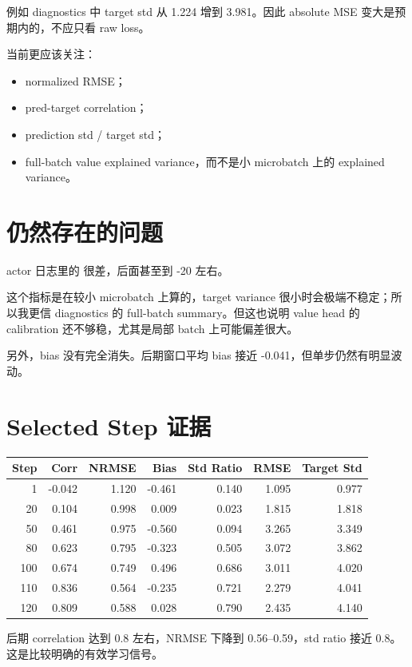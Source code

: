 \documentclass[10pt]{ctexart}
\begin{document}
例如 diagnostics 中 target std 从 1.224 增到 3.981。因此 absolute MSE 变大是预期内的，不应只看 raw loss。

当前更应该关注：
\begin{itemize}
  \item normalized RMSE；
  \item pred-target correlation；
  \item prediction std / target std；
  \item full-batch value explained variance，而不是小 microbatch 上的 explained variance。
\end{itemize}

\section*{仍然存在的问题}
actor 日志里的  很差，后面甚至到 -20 左右。

这个指标是在较小 microbatch 上算的，target variance 很小时会极端不稳定；所以我更信 diagnostics 的 full-batch summary。但这也说明 value head 的 calibration 还不够稳，尤其是局部 batch 上可能偏差很大。

另外，bias 没有完全消失。后期窗口平均 bias 接近 -0.041，但单步仍然有明显波动。

\section*{Selected Step 证据}
\begin{center}
\begin{tabular}{rrrrrrr}
\toprule
Step & Corr & NRMSE & Bias & Std Ratio & RMSE & Target Std \\
\midrule
1 & -0.042 & 1.120 & -0.461 & 0.140 & 1.095 & 0.977 \\
20 & 0.104 & 0.998 & 0.009 & 0.023 & 1.815 & 1.818 \\
50 & 0.461 & 0.975 & -0.560 & 0.094 & 3.265 & 3.349 \\
80 & 0.623 & 0.795 & -0.323 & 0.505 & 3.072 & 3.862 \\
100 & 0.674 & 0.749 & 0.496 & 0.686 & 3.011 & 4.020 \\
110 & 0.836 & 0.564 & -0.235 & 0.721 & 2.279 & 4.041 \\
120 & 0.809 & 0.588 & 0.028 & 0.790 & 2.435 & 4.140 \\
\bottomrule
\end{tabular}
\end{center}

后期 correlation 达到 0.8 左右，NRMSE 下降到 0.56--0.59，std ratio 接近 0.8。这是比较明确的有效学习信号。
\end{document}
